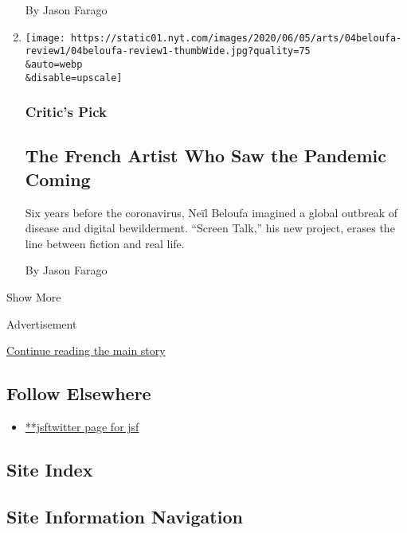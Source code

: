 \begin{enumerate}
  By Jason Farago
\item
  \href{/2020/06/04/arts/design/neil-beloufa-art-review-virus.html}{}

  \texttt{[image: https://static01.nyt.com/images/2020/06/05/arts/04beloufa-review1/04beloufa-review1-thumbWide.jpg?quality=75\\\&auto=webp\\\&disable=upscale]}

  \hypertarget{critics-pick}{%
  \subsubsection{Critic's Pick}\label{critics-pick}}

  \hypertarget{the-french-artist-who-saw-the-pandemic-coming}{%
  \subsection{The French Artist Who Saw the Pandemic
  Coming}\label{the-french-artist-who-saw-the-pandemic-coming}}

  Six years before the coronavirus, Neïl Beloufa imagined a global
  outbreak of disease and digital bewilderment. ``Screen Talk,'' his new
  project, erases the line between fiction and real life.

  By Jason Farago
\end{enumerate}

Show More

Advertisement

\protect\hyperlink{after-mid2}{Continue reading the main story}

\hypertarget{follow-elsewhere}{%
\subsection{Follow Elsewhere}\label{follow-elsewhere}}

\begin{itemize}
\tightlist
\item
  \href{https://twitter.com/jsf}{**jsftwitter page for jsf}
\end{itemize}

\hypertarget{site-index}{%
\subsection{Site Index}\label{site-index}}

\hypertarget{site-information-navigation}{%
\subsection{Site Information
Navigation}\label{site-information-navigation}}

